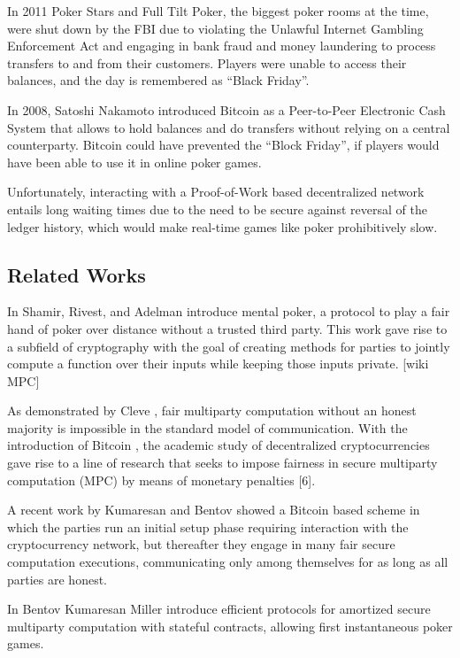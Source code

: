 In 2011 Poker Stars and Full Tilt Poker, the biggest poker rooms at the time, were shut down by the FBI due to violating the Unlawful Internet Gambling Enforcement Act \cite{treasury11} and engaging in bank fraud and money laundering to process transfers to and from their customers. Players were unable to access their balances, and the day is remembered as “Black Friday”.

In 2008, Satoshi Nakamoto introduced Bitcoin  \cite{nakamoto08} as a Peer-to-Peer Electronic Cash System that allows to hold balances and do transfers without relying on a central counterparty. Bitcoin could have prevented the “Block Friday”, if players would have been able to use it in online poker games.
 
Unfortunately, interacting with a Proof-of-Work based decentralized network entails long waiting times due to the need to be secure against reversal of the ledger history, which would make real-time games like poker prohibitively slow.


\subsection{Related Works}
In \cite{shamir81} Shamir, Rivest, and Adelman introduce mental poker, a protocol to play a fair hand of poker over distance without a trusted third party. This work gave rise to a subfield of cryptography with the goal of creating methods for parties to jointly compute a function over their inputs while keeping those inputs private. [wiki MPC]
 
As demonstrated by Cleve \cite{cleve86}, fair multiparty computation without an honest majority is impossible in the standard model of communication. With the introduction of Bitcoin \cite{nakamoto08}, the academic study of decentralized cryptocurrencies gave rise to a line of research that seeks to impose fairness in secure multiparty computation (MPC) by means of monetary penalties [6].
 
A recent work by Kumaresan and Bentov \cite{bentov14} showed a Bitcoin based scheme in which the parties run an initial setup phase requiring interaction with the cryptocurrency network, but thereafter they engage in many fair secure computation executions, communicating only among themselves for as long as all parties are honest.
 
In \cite{bentov17} Bentov Kumaresan Miller introduce efficient protocols for amortized secure multiparty computation with  stateful contracts, allowing first instantaneous poker games. 

